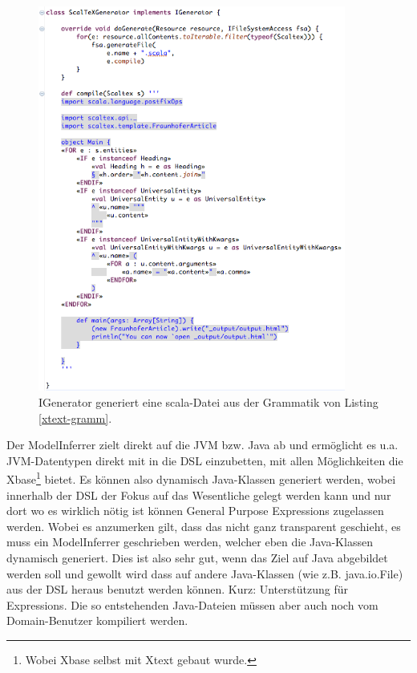 \begin{figure}[h!]
  \centering
    \includegraphics[width=0.9\textwidth]{figures/igenerator.png}
  \caption{IGenerator generiert eine scala-Datei aus der Grammatik von Listing \ref{xtext-gramm}.}\label{fig-igenerator}
\end{figure}

Der ModelInferrer zielt direkt auf die JVM bzw. Java ab und ermöglicht es
u.a. JVM-Datentypen direkt mit in die DSL einzubetten, mit allen Möglichkeiten
die Xbase\footnote{Wobei Xbase selbst mit Xtext gebaut wurde.}
bietet. Es können also dynamisch Java-Klassen generiert werden, wobei innerhalb
der DSL der Fokus auf das Wesentliche gelegt werden kann und nur dort wo es
wirklich nötig ist können General Purpose Expressions zugelassen werden.
Wobei es anzumerken gilt, dass das nicht ganz transparent geschieht,
es muss ein ModelInferrer geschrieben werden, welcher eben die Java-Klassen
dynamisch generiert.
Dies ist also sehr gut, wenn das Ziel auf Java abgebildet werden soll
und gewollt wird dass auf andere Java-Klassen (wie z.B. java.io.File)
aus der DSL heraus benutzt werden können. Kurz: Unterstützung für Expressions.
Die so entstehenden Java-Dateien müssen aber auch noch vom Domain-Benutzer
kompiliert werden.\cite{xtext}

